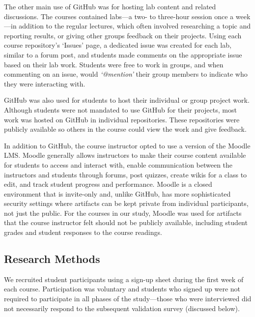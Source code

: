 The other main use of GitHub was for hosting lab content and related discussions. The courses contained labs---a two- to three-hour session once a week---in addition to the regular lectures, which often involved researching a topic and reporting results, or giving other groups feedback on their projects. Using each course repository's `Issues' page, a dedicated issue was created for each lab, similar to a forum post, and students made comments on the appropriate issue based on their lab work. Students were free to work in groups, and when commenting on an issue, would \emph{`@mention'} their group members to indicate who they were interacting with.

GitHub was also used for students to host their individual or group project work. Although students were not mandated to use GitHub for their projects, most work was hosted on GitHub in individual repositories. These repositories were publicly available so others in the course could view the work and give feedback.

In addition to GitHub, the course instructor opted to use a version of the Moodle LMS. Moodle generally allows instructors to make their course content available for students to access and interact with, enable communication between the instructors and students through forums, post quizzes, create wikis for a class to edit, and track student progress and performance. Moodle is a closed environment that is invite-only and, unlike GitHub, has more sophisticated security settings where artifacts can be kept private from individual participants, not just the public. For the courses in our study, Moodle was used for artifacts that the course instructor felt should not be publicly available, including student grades and student responses to the course readings.

\subsection{Research Methods}
We recruited student participants using a sign-up sheet during the first week of each course. Participation was voluntary and students who signed up were not required to participate in all phases of the study---those who were interviewed did not necessarily respond to the subsequent validation survey (discussed below).

